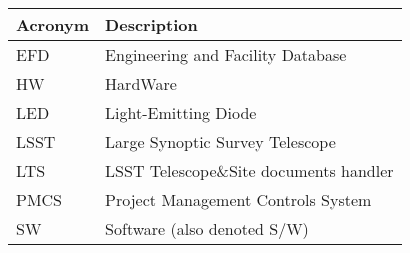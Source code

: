 \addtocounter{table}{-1}
\begin{longtable}{p{}p{}}\hline
\textbf{Acronym} & \textbf{Description}  \\\hline

EFD & Engineering and Facility Database \\\hline
HW & HardWare \\\hline
LED & Light-Emitting Diode \\\hline
LSST & Large Synoptic Survey Telescope \\\hline
LTS & LSST Telescope\&Site documents handler \\\hline
PMCS & Project Management Controls System \\\hline
SW & Software (also denoted S/W) \\\hline
\end{longtable}
